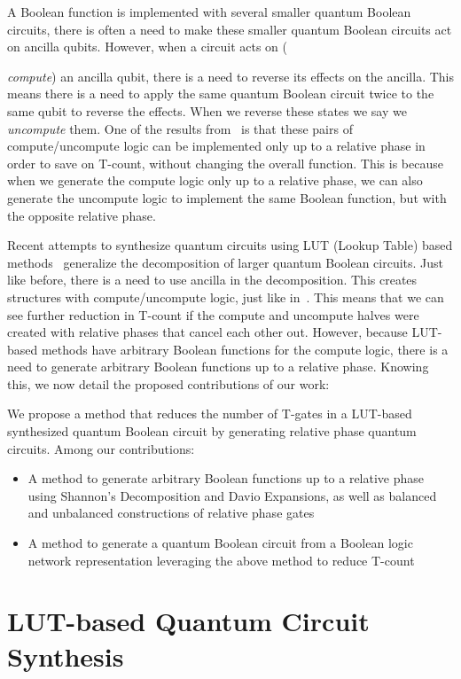 \documentclass[a4paper]{article}
\begin{document}
A Boolean function is implemented with several smaller quantum Boolean circuits, there is
often a need to make these smaller quantum Boolean circuits act on ancilla qubits. However, when a circuit
acts on ({\textit{compute}) an ancilla qubit, there is a need to reverse its effects on the ancilla. This means there is a
need to apply the same quantum Boolean circuit twice to the same qubit to reverse the effects. When we reverse these states we say we {\textit{uncompute}} them.
One of the results from~\cite{bib-rtof-maslov} is that these pairs of compute/uncompute
logic can be implemented only up to a relative phase in order to save on T-count, without changing
the overall function. This is because when we generate the compute logic only up to a relative phase,
we can also generate the uncompute logic to implement the same Boolean function, but with the opposite
relative phase.

Recent attempts to synthesize quantum circuits using LUT (Lookup Table) based methods~\cite{bib-lhrs-soeken} generalize the
decomposition of larger quantum Boolean circuits. Just like before, there is a need to use
ancilla in the decomposition. This creates structures with compute/uncompute logic, just like in~\cite{bib-rtof-maslov}.
This means that we can see further reduction in T-count if the compute and uncompute halves were created with relative phases
that cancel each other out. However, because LUT-based methods have arbitrary Boolean functions for the compute logic,
there is a need to generate arbitrary Boolean functions up to a relative phase. Knowing this, we now detail the
proposed contributions of our work:

We propose a method that reduces the number of T-gates in a LUT-based synthesized quantum Boolean circuit
by generating relative phase quantum circuits. Among our contributions:
\begin{itemize}
\item A method to generate arbitrary Boolean functions up to a relative phase using Shannon's Decomposition and Davio
  Expansions, as well as balanced and unbalanced constructions of relative phase gates
\item A method to generate a quantum Boolean circuit from a Boolean logic network representation leveraging the
  above method to reduce T-count
\end{itemize}

\section{LUT-based Quantum Circuit Synthesis}

}
\end{document}
